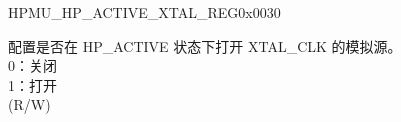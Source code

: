\begin{register}{H}{PMU\_HP\_ACTIVE\_XTAL\_REG}{0x0030}\label{regdesc:PMUHPACTIVEXTALREG}
%
%
\regnewline%
\begin{regdesc}\begin{reglist}
\label{fielddesc:PMUHPACTIVEXPDXTAL}\item [PMU\_HP\_ACTIVE\_XPD\_XTAL] 配置是否在 HP\_ACTIVE 状态下打开 XTAL\_CLK 的模拟源。\\
0：关闭\\
1：打开\\
(R/W)
\end{reglist}\end{regdesc}
\end{register}


